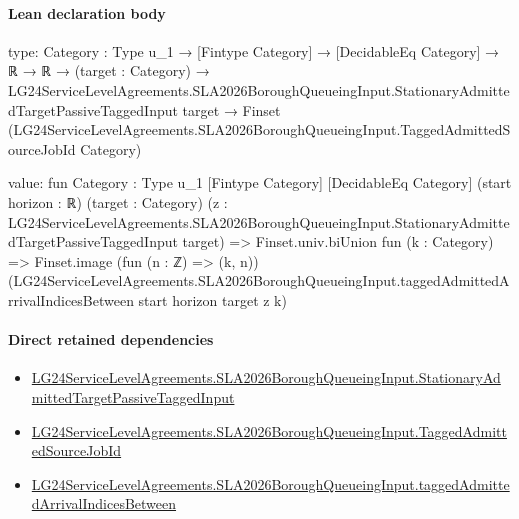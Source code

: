 \documentclass[10pt]{article}
\begin{document}
\paragraph{Lean declaration body}
\begin{ReviewVerbatim}
type:
{Category : Type u_1} →
  [Fintype Category] →
    [DecidableEq Category] →
      ℝ →
        ℝ →
          (target : Category) →
            LG24ServiceLevelAgreements.SLA2026BoroughQueueingInput.StationaryAdmittedTargetPassiveTaggedInput target →
              Finset (LG24ServiceLevelAgreements.SLA2026BoroughQueueingInput.TaggedAdmittedSourceJobId Category)

value:
fun {Category : Type u_1} [Fintype Category] [DecidableEq Category] (start horizon : ℝ) (target : Category)
    (z : LG24ServiceLevelAgreements.SLA2026BoroughQueueingInput.StationaryAdmittedTargetPassiveTaggedInput target) =>
  Finset.univ.biUnion fun (k : Category) =>
    Finset.image (fun (n : ℤ) => (k, n))
      (LG24ServiceLevelAgreements.SLA2026BoroughQueueingInput.taggedAdmittedArrivalIndicesBetween start horizon target z
        k)
\end{ReviewVerbatim}

\paragraph{Direct retained dependencies}
\begin{itemize}\raggedright
\item \hyperlink{governing-declaration-8796a25a610eaea9}{LG24\allowbreak{}Service\allowbreak{}Level\allowbreak{}Agreements.\allowbreak{}SLA2026\allowbreak{}Borough\allowbreak{}Queueing\allowbreak{}Input.\allowbreak{}Stationary\allowbreak{}Admitted\allowbreak{}Target\allowbreak{}Passive\allowbreak{}Tagged\allowbreak{}Input}
\item \hyperlink{governing-declaration-03f187b908407c39}{LG24\allowbreak{}Service\allowbreak{}Level\allowbreak{}Agreements.\allowbreak{}SLA2026\allowbreak{}Borough\allowbreak{}Queueing\allowbreak{}Input.\allowbreak{}Tagged\allowbreak{}Admitted\allowbreak{}Source\allowbreak{}Job\allowbreak{}Id}
\item \hyperlink{governing-declaration-829935ff80d7c57f}{LG24\allowbreak{}Service\allowbreak{}Level\allowbreak{}Agreements.\allowbreak{}SLA2026\allowbreak{}Borough\allowbreak{}Queueing\allowbreak{}Input.\allowbreak{}tagged\allowbreak{}Admitted\allowbreak{}Arrival\allowbreak{}Indices\allowbreak{}Between}
\end{itemize}
\hypertarget{governing-declaration-c80980eaa95ab5a1}{}
\end{document}
